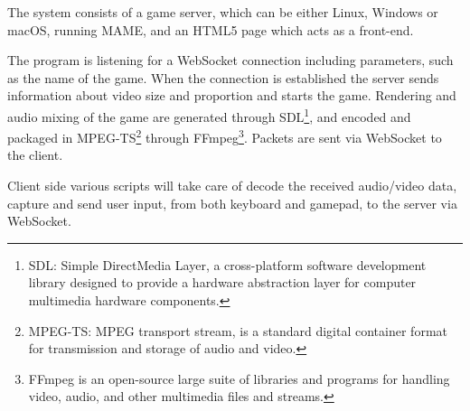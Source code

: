 The system consists of a game server, which can be either Linux, Windows or macOS, running MAME, and an HTML5 page which acts as a front-end.

The program is listening for a WebSocket connection including parameters, such as the name of the game. When the connection is established the server sends information about video size and proportion and starts the game. Rendering and audio mixing of the game are generated through SDL\footnote{SDL: Simple DirectMedia Layer, a cross-platform software development library designed to provide a hardware abstraction layer for computer multimedia hardware components.}, and encoded and packaged in MPEG-TS\footnote{MPEG-TS: MPEG transport stream, is a standard digital container format for transmission and storage of audio and video.} through FFmpeg\footnote{FFmpeg is an open-source large suite of libraries and programs for handling video, audio, and other multimedia files and streams.}. Packets are sent via WebSocket to the client.

Client side various scripts will take care of decode the received audio/video data, capture and send user input, from both keyboard and gamepad, to the server via WebSocket.